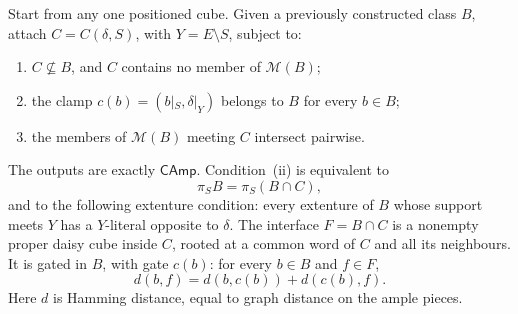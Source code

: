 \begin{proposition}
\label{prop:cube-chordal-generator}
Start from any one positioned cube. Given a previously constructed class
$B$, attach $C=C(\delta,S)$, with $Y=E\setminus S$, subject to:
\begin{enumerate}[label=(\roman*)]
\item $C\not\subseteq B$, and $C$ contains no member of $\mathcal M(B)$;
\item the clamp $c(b)=(b|_S,\delta|_Y)$ belongs to $B$ for every $b\in B$;
\item the members of $\mathcal M(B)$ meeting $C$ intersect pairwise.
\end{enumerate}
The outputs are exactly $\mathsf{CAmp}$. Condition~(ii) is equivalent to
\[
 \pi_SB=\pi_S(B\cap C),
\]
and to the following extenture condition: every extenture of $B$ whose
support meets $Y$ has a $Y$-literal opposite to $\delta$.
The interface $F=B\cap C$ is a nonempty proper daisy cube inside $C$,
rooted at a common word of $C$ and all its neighbours.
It is gated in $B$, with gate $c(b)$: for every $b\in B$ and $f\in F$,
\[
 d(b,f)=d(b,c(b))+d(c(b),f).
\]
Here $d$ is Hamming distance, equal to graph distance on the ample pieces.
\end{proposition}
